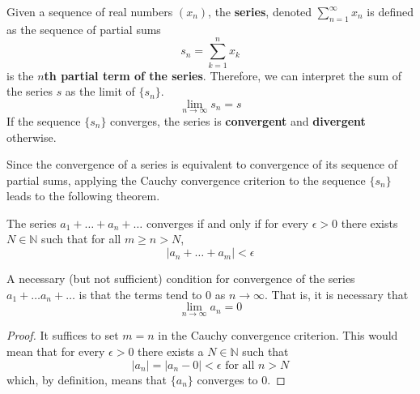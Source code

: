   \begin{definition}
    Given a sequence of real numbers $(x_n)$, the \textbf{series}, denoted $\sum_{n=1}^\infty x_n$ is defined as the sequence of partial sums 
    \begin{equation}
      s_n = \sum_{k=1}^n x_k
    \end{equation}
    is the \textbf{$n$th partial term of the series}. Therefore, we can interpret the sum of the series $s$ as the limit of $\{s_n\}$. 
    \begin{equation}
      \lim_{n \rightarrow \infty} s_n = s
    \end{equation}
    If the sequence $\{s_n\}$ converges, the series is \textbf{convergent} and \textbf{divergent} otherwise. 
  \end{definition}

  Since the convergence of a series is equivalent to convergence of its sequence of partial sums, applying the Cauchy convergence criterion to the sequence $\{s_n\}$ leads to the following theorem. 

  \begin{theorem}
    The series $a_1 + \ldots + a_n + \ldots$ converges if and only if for every $\epsilon > 0$ there exists $N \in \mathbb{N}$ such that for all $m \geq n > N$, 
    \begin{equation}
      |a_n + \ldots + a_m| < \epsilon
    \end{equation}
  \end{theorem}

  \begin{corollary}
    A necessary (but not sufficient) condition for convergence of the series $a_1 + \ldots a_n + \ldots$ is that the terms tend to $0$ as $n \rightarrow \infty$. That is, it is necessary that
    \begin{equation}
      \lim_{n\rightarrow \infty} a_n = 0
    \end{equation}
  \end{corollary}
  \begin{proof}
    It suffices to set $m = n$ in the Cauchy convergence criterion. This would mean that for every $\epsilon > 0$ there exists a $N \in \mathbb{N}$ such that 
    \begin{equation}
      |a_n| = |a_n - 0| < \epsilon \text{ for all } n > N
    \end{equation}
    which, by definition, means that $\{a_n\}$ converges to $0$. 
  \end{proof}

